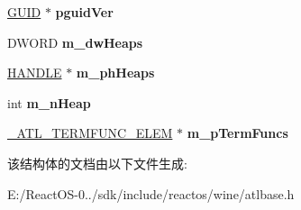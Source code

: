 \begin{DoxyCompactItemize}
\hyperlink{interface_g_u_i_d}{G\+U\+ID} $\ast$ {\bfseries pguid\+Ver}
\item 
\mbox{\label{struct___a_t_l___m_o_d_u_l_e_a___t_a_g_a31536536dafc989f4680c8a4101b039b}} 
D\+W\+O\+RD {\bfseries m\+\_\+dw\+Heaps}
\item 
\mbox{\label{struct___a_t_l___m_o_d_u_l_e_a___t_a_g_a904589279eba8f1855ad415bdcd72991}} 
\hyperlink{interfacevoid}{H\+A\+N\+D\+LE} $\ast$ {\bfseries m\+\_\+ph\+Heaps}
\item 
\mbox{\label{struct___a_t_l___m_o_d_u_l_e_a___t_a_g_a3eab355ce5c42d3c0d22b167465300f1}} 
int {\bfseries m\+\_\+n\+Heap}
\item 
\mbox{\label{struct___a_t_l___m_o_d_u_l_e_a___t_a_g_a60381b068f9a6614adc11d53fbf36a6a}} 
\hyperlink{struct___a_t_l___t_e_r_m_f_u_n_c___e_l_e_m___t_a_g}{\+\_\+\+A\+T\+L\+\_\+\+T\+E\+R\+M\+F\+U\+N\+C\+\_\+\+E\+L\+EM} $\ast$ {\bfseries m\+\_\+p\+Term\+Funcs}
\end{DoxyCompactItemize}


该结构体的文档由以下文件生成\+:\begin{DoxyCompactItemize}
\item 
E\+:/\+React\+O\+S-\/0../sdk/include/reactos/wine/atlbase.\+h\end{DoxyCompactItemize}
